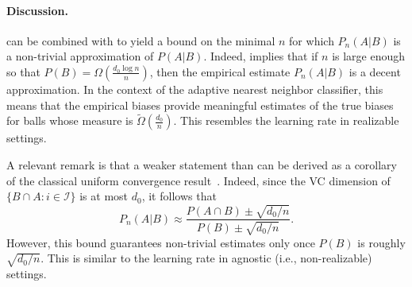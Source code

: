 \documentclass{article}
\def\B{{\mathcal B}}
\newcommand{\I}{\mathcal{I}}
\newtheorem{lemma}[theorem]{Lemma}
\newcommand{\comment}[3]{{\color{#1} {\bf #2 :} #3}}
\newcommand{\shay}[1]{\comment{purple}{Shay}{#1}}
\begin{document}
\paragraph{Discussion.}
 can be combined with 
to yield a bound on the minimal $n$ for which $P_n(A \vert B)$ 
is a non-trivial approximation of $P(A \vert B)$.
Indeed,  implies that 
if $n$ is large enough so that $P(B)=\Omega\left(\frac{d_0\log n}{n}\right)$, 
then the empirical estimate $P_n(A\vert B)$ is a decent approximation.
In the context of the adaptive nearest neighbor classifier, this means that the empirical
biases provide meaningful estimates of the true biases for balls whose measure is $\tilde\Omega\left(\frac{d_0}{n}\right)$.
This resembles the learning rate in realizable settings.
%
%

A relevant remark is that a weaker statement than 
can be derived as a corollary of the classical uniform convergence
result~\citep{vapnik1971uniform}. 
Indeed, since the VC dimension of $\{B\cap A : i\in \I\}$ is at most $d_0$, it follows that 
\[P_n(A\vert B)\approx\frac{P(A\cap B) \pm \sqrt{d_0 / n}}{P(B)\pm \sqrt{d_0 / n}}.\]
However, this bound guarantees non-trivial estimates only once $P(B)$ is roughly $\sqrt{d_0  / n}$.
This is similar to the learning rate in agnostic (i.e., non-realizable) settings.
\end{document}

